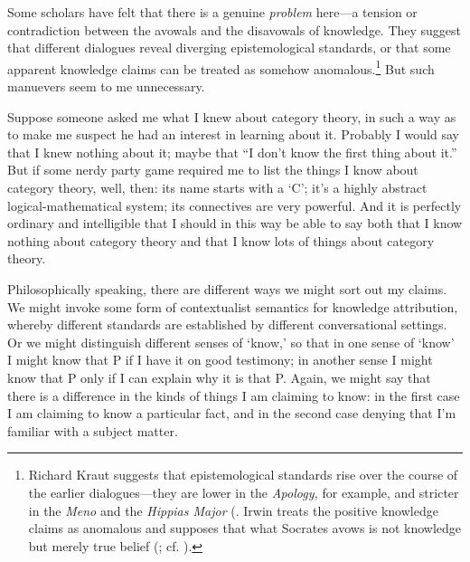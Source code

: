 ﻿\documentclass[11pt]{amsart}
\begin{document}



Some scholars have felt that there is a genuine \emph{problem} here---a tension or contradiction between the avowals and the disavowals of knowledge. They suggest that different dialogues reveal diverging epistemological standards, or that some apparent knowledge claims can be treated as somehow anomalous.\footnote{Richard Kraut suggests that epistemological standards rise over the course of the earlier dialogues---they are lower in the \emph{Apology,} for example, and stricter in the \emph{Meno} and the \emph{Hippias Major} (\citet[xx]{kraut1984sas}. Irwin treats the positive knowledge claims as anomalous and supposes that what Socrates avows is not knowledge but merely true belief (\citet[xx]{irwin1977pmt}; cf. \citet[28--9]{irwin1995pse}).} But such manuevers seem to me unnecessary.

Suppose someone asked me what I knew about category theory, in such a way as to make me suspect he had an interest in learning about it. Probably I would say that I knew nothing about it; maybe that ``I don't know the first thing about it.'' But if some nerdy party game required me to list the things I know about category theory, well, then: its name starts with a `C'; it's a highly abstract logical-mathematical system; its connectives are very powerful. And it is perfectly ordinary and intelligible that I should in this way be able to say both that I know nothing about category theory and that I know lots of things about category theory. %


Philosophically speaking, there are different ways we might sort out my claims. We might invoke some form of contextualist semantics for knowledge attribution, whereby different standards are established by different conversational settings. Or we might distinguish different senses of `know,' so that in one sense of `know' I might know that P if I have it on good testimony; in another sense I might know that P only if I can explain why it is that P. Again, we might say that there is a difference in the kinds of things I am claiming to know: in the first case I am claiming to know a particular fact, and in the second case denying that I'm familiar with a subject matter.
\end{document}
